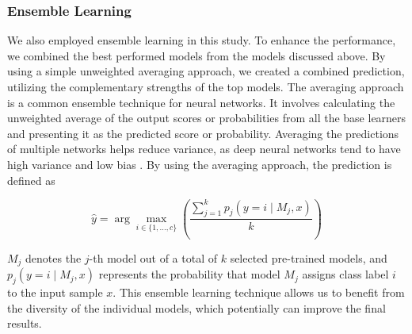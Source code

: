 \documentclass[11pt]{article}
\begin{document}

\subsubsection{Ensemble Learning}
We also employed ensemble learning in this study. To enhance the performance, we combined the best performed models from the models discussed above. By using a simple unweighted averaging approach, we created a combined prediction, utilizing the complementary strengths of the top models. The averaging approach is a common ensemble technique for neural networks. It involves calculating the unweighted average of the output scores or probabilities from all the base learners and presenting it as the predicted score or probability. Averaging the predictions of multiple networks helps reduce variance, as deep neural networks tend to have high variance and low bias \citep{ganaie2022ensemble}. By using the averaging approach, the prediction is defined as

\begin{equation}
    \hat{y} = \arg\max_{i \in \{1, \dots, c\}} \left( \frac{\sum_{j=1}^{k} p_j (y = i \mid M_j, x)}{k} \right)
\end{equation}


\noindent \( M_j \) denotes the \( j \)-th model out of a total of \( k \) selected pre-trained models, and \( p_j(y = i \mid M_j, x) \) represents the probability that model \( M_j \) assigns class label \( i \) to the input sample \( x \). This ensemble learning technique allows us to benefit from the diversity of the individual models, which potentially can improve the final results. 
\end{document}
